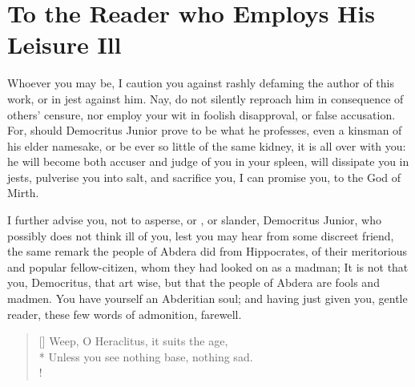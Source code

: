 \chapter{To the Reader who Employs His Leisure Ill}
{Whoever you may be, I caution you against rashly defaming the author of
this work, or  in jest against him. Nay, do not silently
reproach him in consequence of others' censure, nor employ your wit in
foolish disapproval, or false accusation. For, should Democritus Junior
prove to be what he professes, even a kinsman of his elder namesake, or
be ever so little of the same kidney, it is all over with you: he will
become both accuser and judge of you in your spleen, will dissipate you
in jests, pulverise you into salt, and sacrifice you, I can promise
you, to the God of Mirth.

I further advise you, not to asperse, or , or slander,
Democritus Junior, who possibly does not think ill of you, lest you may
hear from some discreet friend, the same remark the people of Abdera
did from Hippocrates, of their meritorious and popular fellow-citizen,
whom they had looked on as a madman; It is not that you, Democritus,
that art wise, but that the people of Abdera are fools and madmen. You
have yourself an Abderitian soul; and having just given you, gentle
reader, these few words of admonition, farewell.

%
%
%
%
%
%
\settowidth{\versewidth}{A thousand Heraclitus', a thousand Democritus' are required.}
\begin{verse}[\versewidth]
Weep, O Heraclitus, it suits the age,\\*
Unless you see nothing base, nothing sad.\\!


\end{verse}}
